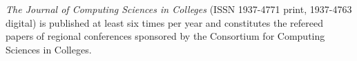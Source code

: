 \documentclass[article,twoside]{combine}
\begin{document}
\pagestyle{combine} %

\thispagestyle{empty}


\clearpage

\null
\vfill

{\parindent0pt
\textit{The Journal of Computing Sciences in Colleges}
(ISSN 1937-4771 print, 1937-4763 digital) is published at least six times per
year and constitutes the refereed papers of regional conferences sponsored by
the Consortium for Computing Sciences in Colleges.

\vspace{10pt}


}

\clearpage

\tableofcontents %
\end{document}
